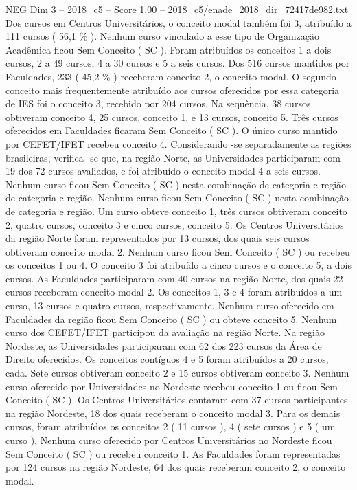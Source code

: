 \begin{textsample}{NEG Dim 3 – 2018\_c5 – Score 1.00 – 2018\_c5/enade\_2018\_dir\_72417de982.txt}
Dos cursos em Centros Universitários, o conceito modal também foi 3, atribuído a 111 cursos ( 56,1 \% ).
Nenhum curso vinculado a esse tipo de Organização Acadêmica ficou Sem Conceito ( SC ).
Foram atribuídos os conceitos 1 a dois cursos, 2 a 49 cursos, 4 a 30 cursos e 5 a seis cursos.
Dos 516 cursos mantidos por Faculdades, 233 ( 45,2 \% ) receberam conceito 2, o conceito modal.
O segundo conceito mais frequentemente atribuído aos cursos oferecidos por essa categoria de IES foi o conceito 3, recebido por 204 cursos.
Na sequência, 38 cursos obtiveram conceito 4, 25 cursos, conceito 1, e 13 cursos, conceito 5.
Três cursos oferecidos em Faculdades ficaram Sem Conceito ( SC ).
O único curso mantido por CEFET/IFET recebeu conceito 4.
Considerando -se separadamente as regiões brasileiras, verifica -se que, na região Norte, as Universidades participaram com 19 dos 72 cursos avaliados, e foi atribuído o conceito modal 4 a seis cursos.
Nenhum curso ficou Sem Conceito ( SC ) nesta combinação de categoria e região de categoria e região.
Nenhum curso ficou Sem Conceito ( SC ) nesta combinação de categoria e região.
Um curso obteve conceito 1, três cursos obtiveram conceito 2, quatro cursos, conceito 3 e cinco cursos, conceito 5.
Os Centros Universitários da região Norte foram representados por 13 cursos, dos quais seis cursos obtiveram conceito modal 2.
Nenhum curso ficou Sem Conceito ( SC ) ou recebeu os conceitos 1 ou 4.
O conceito 3 foi atribuído a cinco cursos e o conceito 5, a dois cursos.
As Faculdades participaram com 40 cursos na região Norte, dos quais 22 cursos receberam conceito modal 2.
Os conceitos 1, 3 e 4 foram atribuídos a um curso, 13 cursos e quatro cursos, respectivamente.
Nenhum curso oferecido em Faculdades da região ficou Sem Conceito ( SC ) ou obteve conceito 5.
Nenhum curso dos CEFET/IFET participou da avaliação na região Norte.
Na região Nordeste, as Universidades participaram com 62 dos 223 cursos da Área de Direito oferecidos.
Os conceitos contíguos 4 e 5 foram atribuídos a 20 cursos, cada.
Sete cursos obtiveram conceito 2 e 15 cursos obtiveram conceito 3.
Nenhum curso oferecido por Universidades no Nordeste recebeu conceito 1 ou ficou Sem Conceito ( SC ).
Os Centros Universitários contaram com 37 cursos participantes na região Nordeste, 18 dos quais receberam o conceito modal 3.
Para os demais cursos, foram atribuídos os conceitos 2 ( 11 cursos ), 4 ( sete cursos ) e 5 ( um curso ).
Nenhum curso oferecido por Centros Universitários no Nordeste ficou Sem Conceito ( SC ) ou recebeu conceito 1.
As Faculdades foram representadas por 124 cursos na região Nordeste, 64 dos quais receberam conceito 2, o conceito modal.

\end{textsample}
